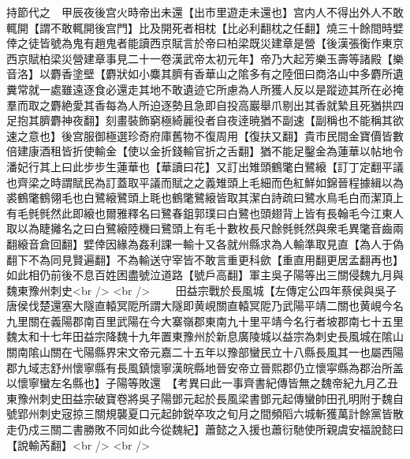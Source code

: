 持節代之　甲辰夜後宫火時帝出未還【出市里遊走未還也】宫内人不得出外人不敢輒開【謂不敢輒開後宫門】比及開死者相枕【比必利翻枕之任翻】燒三十餘間時嬖倖之徒皆號為鬼有趙鬼者能讀西京賦言於帝曰柏梁既災建章是營【後漢張衡作東京西京賦柏梁災營建章事見二十一卷漢武帝太初元年】帝乃大起芳樂玉壽等諸殿【樂音洛】以麝香塗壁【麝狀如小麋其臍有香華山之隂多有之陸佃曰商洛山中多麝所遺糞常就一處雖遠逐食必還走其地不敢遺迹它所慮為人所獲人反以是蹤迹其所在必掩羣而取之麝絶愛其香每為人所迫逐勢且急即自投高巖舉爪剔出其香就縶且死猶拱四足抱其臍麝神夜翻】刻畫裝飾窮極綺麗役者自夜逹暁猶不副速【副稱也不能稱其欲速之意也】後宫服御極選珍奇府庫舊物不復周用【復扶又翻】貴市民間金寶價皆數倍建康酒租皆折使輸金【使以金折錢輸官折之舌翻】猶不能足鑿金為蓮華以帖地令潘妃行其上曰此步步生蓮華也【華讀曰花】又訂出雉頭鶴氅白鷺縗【訂丁定翻平議也齊梁之時謂賦民為訂蓋取平議而賦之之義雉頭上毛細而色紅鮮如錦晉程據緝以為裘鶴氅鶴翎毛也白鷺縗鷺頭上毦也鶴氅鷺縗皆取其潔白詩疏曰鷺水鳥毛白而潔頂上有毛毿毿然此即縗也爾雅釋名曰鷺春鉏郭璞曰白鷺也頭翅背上皆有長翰毛今江東人取以為睫攡名之曰白鷺縗陸機曰鷺頭上有毛十數枚長尺餘毿毿然與衆毛異氅音齒兩翻縗音倉回翻】嬖倖因緣為姦利課一輸十又各就州縣求為人輸準取見直【為人于偽翻下不為同見賢遍翻】不為輸送守宰皆不敢言重更科歛【重直用翻更居孟翻再也】如此相仍前後不息百姓困盡號泣道路【號戶高翻】軍主吳子陽等出三關侵魏九月與魏東豫州刺史<br />
<br />
　　田益宗戰於長風城【左傳定公四年蔡侯與吳子唐侯伐楚還塞大隧直轅冥阸所謂大隧即黄峴關直轅冥阸乃武陽平靖二關也黄峴今名九里關在義陽郡南百里武陽在今大寨嶺郡東南九十里平靖今名行者坡郡南七十五里魏太和十七年田益宗降魏十九年置東豫州於新息廣陵城以益宗為刺史長風城在隂山關南隂山關在弋陽縣界宋文帝元嘉二十五年以豫部蠻民立十八縣長風其一也屬西陽郡九域志舒州懷寧縣有長風鎮懷寧漢皖縣地晉安帝立晉熙郡仍立懷寜縣為郡治所盖以懷寧蠻左名縣也】子陽等敗還　【考異曰此一事齊書紀傳皆無之魏帝紀九月乙丑東豫州刺史田益宗破寶卷將吳子陽鄧元起於長風梁書鄧元起傳蠻帥田孔明附于魏自號郢州刺史宼掠三關規襲夏口元起帥鋭卒攻之旬月之間頻䧟六城斬獲萬計餘黨皆散走仍戍三關二書勝敗不同如此今從魏紀】蕭懿之入援也蕭衍馳使所親虞安福說懿曰【說輸芮翻】<br />
<br />
